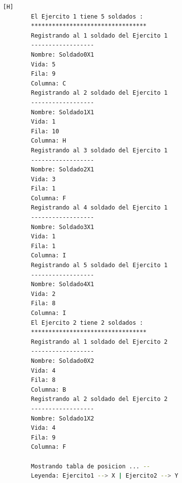 \documentclass{article}
\begin{document}
	\begin{lstlisting}[language=bash,caption={Ejecucion:}][H]
		El Ejercito 1 tiene 5 soldados : 
		*********************************
		Registrando al 1 soldado del Ejercito 1
		------------------
		Nombre: Soldado0X1
		Vida: 5
		Fila: 9
		Columna: C
		Registrando al 2 soldado del Ejercito 1
		------------------
		Nombre: Soldado1X1
		Vida: 1
		Fila: 10
		Columna: H
		Registrando al 3 soldado del Ejercito 1
		------------------
		Nombre: Soldado2X1
		Vida: 3
		Fila: 1
		Columna: F
		Registrando al 4 soldado del Ejercito 1
		------------------
		Nombre: Soldado3X1
		Vida: 1
		Fila: 1
		Columna: I
		Registrando al 5 soldado del Ejercito 1
		------------------
		Nombre: Soldado4X1
		Vida: 2
		Fila: 8
		Columna: I
		El Ejercito 2 tiene 2 soldados : 
		*********************************
		Registrando al 1 soldado del Ejercito 2
		------------------
		Nombre: Soldado0X2
		Vida: 4
		Fila: 8
		Columna: B
		Registrando al 2 soldado del Ejercito 2
		------------------
		Nombre: Soldado1X2
		Vida: 4
		Fila: 9
		Columna: F
		
		Mostrando tabla de posicion ... --
		Leyenda: Ejercito1 --> X | Ejercito2 --> Y
		
	\end{lstlisting}
\end{document}
